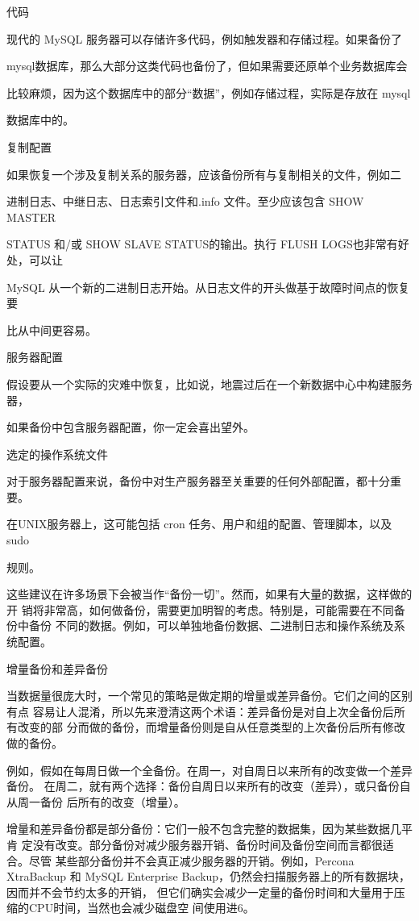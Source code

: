代码

现代的 MySQL 服务器可以存储许多代码，例如触发器和存储过程。如果备份了

mysql数据库，那么大部分这类代码也备份了，但如果需要还原单个业务数据库会

比较麻烦，因为这个数据库中的部分“数据”，例如存储过程，实际是存放在 mysql

数据库中的。

复制配置

如果恢复一个涉及复制关系的服务器，应该备份所有与复制相关的文件，例如二

进制日志、中继日志、日志索引文件和.info 文件。至少应该包含 SHOW MASTER

STATUS 和/或 SHOW SLAVE STATUS的输出。执行 FLUSH LOGS也非常有好处，可以让

MySQL 从一个新的二进制日志开始。从日志文件的开头做基于故障时间点的恢复要

比从中间更容易。

服务器配置

假设要从一个实际的灾难中恢复，比如说，地震过后在一个新数据中心中构建服务器，

如果备份中包含服务器配置，你一定会喜出望外。

选定的操作系统文件

对于服务器配置来说，备份中对生产服务器至关重要的任何外部配置，都十分重要。

在UNIX服务器上，这可能包括 cron 任务、用户和组的配置、管理脚本，以及 sudo

规则。

这些建议在许多场景下会被当作“备份一切”。然而，如果有大量的数据，这样做的开
销将非常高，如何做备份，需要更加明智的考虑。特别是，可能需要在不同备份中备份
不同的数据。例如，可以单独地备份数据、二进制日志和操作系统及系统配置。

增量备份和差异备份

当数据量很庞大时，一个常见的策略是做定期的增量或差异备份。它们之间的区别有点
容易让人混淆，所以先来澄清这两个术语：差异备份是对自上次全备份后所有改变的部
分而做的备份，而增量备份则是自从任意类型的上次备份后所有修改做的备份。

例如，假如在每周日做一个全备份。在周一，对自周日以来所有的改变做一个差异备份。
在周二，就有两个选择：备份自周日以来所有的改变（差异），或只备份自从周一备份
后所有的改变（增量）。

增量和差异备份都是部分备份：它们一般不包含完整的数据集，因为某些数据几平肯
定没有改变。部分备份对减少服务器开销、备份时间及备份空间而言都很适合。尽管
某些部分备份并不会真正减少服务器的开销。例如，Percona XtraBackup 和 MySQL
Enterprise Backup，仍然会扫描服务器上的所有数据块，因而并不会节约太多的开销，
但它们确实会减少一定量的备份时间和大量用于压缩的CPU时间，当然也会减少磁盘空
间使用进6。

